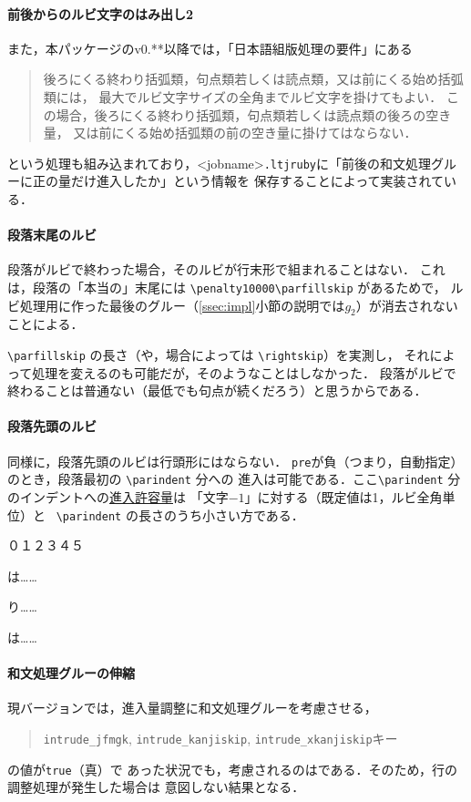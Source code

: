 \documentclass[a4paper,10ptj]{ltjsarticle}
\def\emph#1{\textbf{\textgt{#1}}}
\begin{document}
\paragraph{前後からのルビ文字のはみ出し2}
また，本パッケージのv0.**以降では，「日本語組版処理の要件」にある
\begin{quote}
  後ろにくる終わり括弧類，句点類若しくは読点類，又は前にくる始め括弧類には，
  最大でルビ文字サイズの全角までルビ文字を掛けてもよい．
  この場合，後ろにくる終わり括弧類，句点類若しくは読点類の後ろの空き量，
  又は前にくる始め括弧類の前の空き量に掛けてはならない．
\end{quote}
という処理も組み込まれており，<jobname>\texttt{.ltjruby}に「前後の和文処理グルーに正の量だけ進入したか」という情報を
保存することによって実装されている．

\paragraph{段落末尾のルビ}
段落がルビで終わった場合，そのルビが行末形で組まれることはない．
これは，段落の「本当の」末尾には \verb+\penalty10000\parfillskip+ があるためで，
ルビ処理用に作った最後のグルー（\ref{ssec:impl}\nobreak 小節の説明では$g_2$）が消去されないことによる．

\verb+\parfillskip+ の長さ（や，場合によっては \verb+\rightskip+）を実測し，
それによって処理を変えるのも可能だが，そのようなことはしなかった．
段落がルビで終わることは普通ない（最低でも句点が続くだろう）と思うからである．

\paragraph{段落先頭のルビ}
同様に，段落先頭のルビは行頭形にはならない．
\texttt{pre}が負（つまり，自動指定）のとき，段落最初の \verb+\parindent+ 分への
進入は可能である．ここ\verb+\parindent+ 分のインデントへの\underline{進入許容量}は
「文字$-1$」に対する（既定値は1，ルビ全角単位）と
\ \verb+\parindent+ の長さのうち小さい方である．
\begin{LTXexample}[preset=\Large,width=0.4\textwidth]
\zw\noindent ０１２３４５\par
{}は……\par
{}り……\par
{}\zw{}は……
\end{LTXexample}

\paragraph{和文処理グルーの伸縮}
現バージョンでは，進入量調整に和文処理グルーを考慮させる，
\begin{quote}
\texttt{intrude\_jfmgk}, \texttt{intrude\_kanjiskip}, \texttt{intrude\_xkanjiskip}キー
\end{quote}
の値が\texttt{true}（真）で
あった状況でも，考慮されるのは\emph{自然長の値のみ}である．そのため，行の調整処理が発生した場合は
意図しない結果となる．
\end{document}
